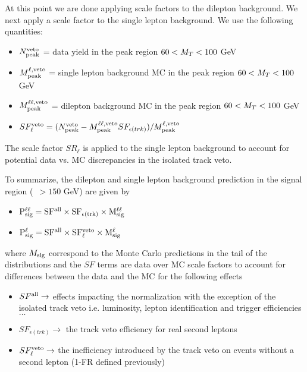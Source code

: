 At this point we are done applying scale factors to the dilepton background. We next apply a scale factor to the single lepton background. We use the following quantities:


\begin{itemize}
\item $N_{\rm{peak}}^{\rm{veto}}$ =  data yield in the peak region $60<M_T<100$ GeV
\item $M^{\ell,\rm{veto}}_{\rm{peak}}$ =  single lepton background MC in the peak region $60<M_T<100$ GeV
\item $M^{\ell\ell,\rm{veto}}_{\rm{peak}}$ =  dilepton background MC in the peak region $60<M_T<100$ GeV
\item $SF_{\ell}^{\rm{veto}} = (N_{\rm{peak}}^{\rm{veto}} - M^{\ell\ell,\rm{veto}}_{\rm{peak}} SF_{\epsilon(trk)} )/ M^{\ell,\rm{veto}}_{\rm{peak}}$
\end{itemize}

The scale factor $SR_{\ell}$ is applied to the single lepton background to account for potential data vs. MC discrepancies 
in the isolated track veto.

To summarize, the dilepton and single lepton background prediction in the signal region (\mt\ $>150$ GeV) are given by

\begin{itemize}
\item $\rm{P}^{\ell\ell}_{\rm{sig}} = SF^{\rm{all}} \times SF_{\epsilon(trk)} \times M^{\ell \ell}_{\rm{sig}}$
\item $\rm{P}^{\ell}_{\rm{sig}} = SF^{\rm{all}} \times SF_{\ell}^{\rm{veto}} \times M^{\ell}_{\rm{sig}}$
\end{itemize}

where $M_{\rm{sig}}$ correspond to the Monte Carlo predictions in the tail of the distributions and the $SF$ terms are data over MC scale factors to account 
for differences between the data and the MC for the following effects

\begin{itemize}
\item $SF^{\rm{all}} \rightarrow $ effects impacting the normalization with the exception of the isolated track veto i.e. luminosity, 
lepton identification and trigger efficiencies $\dots$
\item $SF_{\epsilon(trk)} \rightarrow $ the track veto efficiency for real second leptons
\item $SF_{\ell}^{\rm{veto}} \rightarrow $ the inefficiency introduced by the track veto on events without a second lepton (1-FR defined previously)
\end{itemize}




